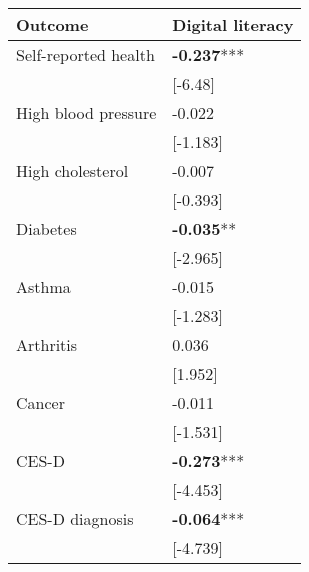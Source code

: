 \documentclass[11pt]{article}
\begin{document}
    \begin{tabular}{ll}
        \toprule
        Outcome & Digital literacy \\
        \midrule
        Self-reported health & \textbf{-0.237}*** \\
        & [-6.48] \\
        High blood pressure & -0.022 \\
        & [-1.183] \\
        High cholesterol & -0.007 \\
        & [-0.393] \\
        Diabetes & \textbf{-0.035}** \\
        & [-2.965] \\
        Asthma & -0.015 \\
        & [-1.283] \\
        Arthritis & 0.036 \\
        & [1.952] \\
        Cancer & -0.011 \\
        & [-1.531] \\
        CES-D & \textbf{-0.273}*** \\
        & [-4.453] \\
        CES-D diagnosis & \textbf{-0.064}*** \\
        & [-4.739] \\
        \bottomrule
    \end{tabular}
\end{document}
